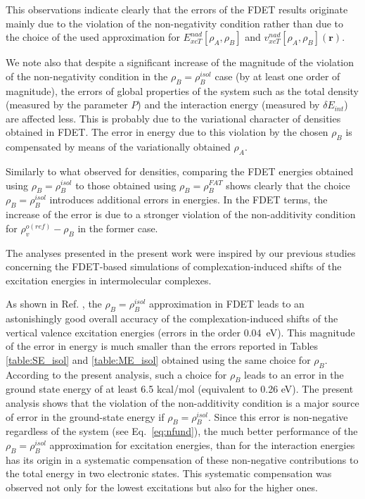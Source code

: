 \documentclass[amsmath,amssymb,preprint,aip,jcp]{revtex4-1}
\begin{document}
This observations indicate clearly that the errors of the FDET results originate mainly due to the violation of the non-negativity condition rather than due to the choice of the used approximation for ${E}_{xcT}^{nad}[\rho_A,\rho_B]$ and ${v}_{xcT}^{nad}[\rho_A,\rho_B](\mathbf{r})$.

We note also that despite a significant increase of the magnitude of the violation of the non-negativity condition in the $\rho_B=\rho_B^{isol}$ case (by at least one order of magnitude), the errors of global properties of the system such as the total density (measured by the parameter $P$) and the interaction energy (measured by $\delta E_{int}$) are affected less. This is probably due to the variational character of densities obtained in FDET. The error in energy due to this violation by the chosen $\rho_B$ is compensated by means of the variationally obtained $\rho_A$.

Similarly to what observed for densities, comparing the FDET energies obtained using $\rho_B=\rho_B^{isol}$ to those obtained using $\rho_B=\rho_B^{FAT}$ shows clearly that the choice $\rho_B=\rho_B^{isol}$ introduces additional errors in energies. In the FDET terms, the increase of the error is due to a stronger violation of the non-additivity condition for $\rho_v^{o(ref)}-\rho_B$ in the former case.

The analyses presented in the present work were inspired by our previous studies concerning the FDET-based simulations of complexation-induced shifts of the excitation energies in intermolecular complexes.

As shown in Ref. , the $\rho_B=\rho_B^{isol}$ approximation in FDET leads to an astonishingly good overall accuracy of the complexation-induced shifts of the vertical valence excitation energies (errors in the order 0.04~eV). 
This magnitude of the error in energy is much smaller than the errors reported in Tables \ref{table:SE_isol} and \ref{table:ME_isol} obtained using the same choice for $\rho_B$. 
According to the present analysis, such a choice for 
$\rho_B$ leads to an error in the ground state energy of at least 6.5 kcal/mol (equivalent to 0.26 eV).
The present analysis shows that the violation of the non-additivity condition is a major source of error in the ground-state energy if $\rho_B=\rho_B^{isol}$. Since this error is non-negative regardless of the system (see Eq.~\ref{eq:nfund}),
the much better performance of the $\rho_B=\rho_B^{isol}$ approximation for excitation energies\cite{Ricardi2018}, than for the interaction energies has its origin in a systematic compensation of these non-negative contributions to the total energy in two electronic states. This systematic compensation was observed not only for the lowest excitations but also for the higher ones. 
\end{document}
